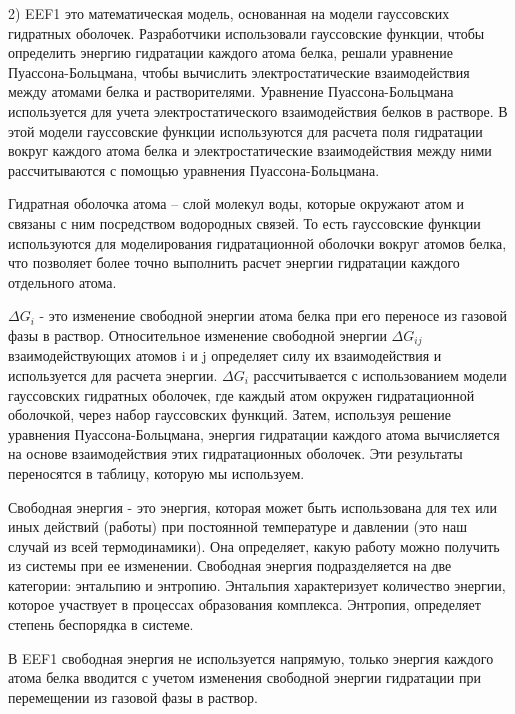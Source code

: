 \documentclass[17pt]{extarticle}
\begin{document}
2) EEF1 это математическая модель, основанная на модели гауссовских гидратных оболочек. Разработчики использовали гауссовские функции, чтобы определить энергию гидратации каждого атома белка, решали уравнение Пуассона-Больцмана, чтобы вычислить электростатические взаимодействия между атомами белка и растворителями. Уравнение Пуассона-Больцмана используется для учета электростатического взаимодействия белков в растворе. В этой модели гауссовские функции используются для расчета поля гидратации вокруг каждого атома белка и электростатические взаимодействия между ними рассчитываются с помощью уравнения Пуассона-Больцмана. 

Гидратная оболочка атома -- слой молекул воды, которые окружают атом и связаны с ним посредством водородных связей. То есть гауссовские функции используются для моделирования гидратационной оболочки вокруг атомов белка, что позволяет более точно выполнить расчет энергии гидратации каждого отдельного атома.

$\Delta G_i$ - это изменение свободной энергии атома белка при его переносе из газовой фазы в раствор. Относительное изменение свободной энергии $\Delta G_{ij}$ взаимодействующих атомов i и j определяет силу их взаимодействия и используется для расчета энергии. $\Delta G_i$ рассчитывается с использованием модели гауссовских гидратных оболочек, где каждый атом окружен гидратационной оболочкой, через набор гауссовских функций. Затем, используя решение уравнения Пуассона-Больцмана, энергия гидратации каждого атома вычисляется на основе взаимодействия этих гидратационных оболочек. Эти результаты переносятся в таблицу, которую мы используем.

Свободная энергия - это энергия, которая может быть использована для тех или иных действий (работы) при постоянной температуре и давлении (это наш случай из всей термодинамики). Она определяет, какую работу можно получить из системы при ее изменении. Свободная энергия подразделяется на две категории: энтальпию и энтропию. Энтальпия характеризует количество энергии, которое участвует в процессах образования комплекса. Энтропия, определяет степень беспорядка в системе.

В EEF1 свободная энергия не используется напрямую, только энергия каждого атома белка вводится с учетом изменения свободной энергии гидратации при перемещении из газовой фазы в раствор.
\end{document}
